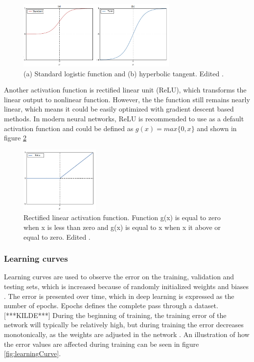 \begin{figure} [H]
\centering
\includegraphics[width=0.7\textwidth]{figures/Sigmoids}
\caption{(a) Standard logistic function and (b) hyperbolic tangent. Edited \citep{Bengio2012}.}
\label{fig:Sigmoids}
\end{figure}

\noindent
Another activation function is rectified linear unit (ReLU), which transforms the linear output to nonlinear function. However, the the function still remains nearly linear, which means it could be easily optimized with gradient descent based methods\citep{Goodfellow2016}. In modern neural networks, ReLU is recommended to use as a default activation function and could be defined as $g(x) = max\{0, x\}$ and shown in figure \ref{fig:Relu}

\begin{figure} [H]
\centering
\includegraphics[width=0.35\textwidth]{figures/Relu}
\caption{Rectified linear activation function. Function g(x) is equal to zero when x is less than zero and g(x) is equal to x when x it above or equal to zero.
Edited \citep{Goodfellow2016}.}
\label{fig:Relu}
\end{figure}

\subsubsection{Learning curves}
Learning curves are used to observe the error on the training, validation and testing sets, which is increased because of randomly initialized weights and biases \citep{Duda2000}. The error is presented over time, which in deep learning is expressed as the number of epochs. Epochs defines the complete pass through a dataset. [***KILDE***]
During the beginning of training, the training error of the network will typically be relatively high, but during training the error decreases monotonically, as the weights are adjusted in the network \citep{Duda2000}. An illustration of how the error values are affected during training can be seen in figure \ref{fig:learningCurve}.

